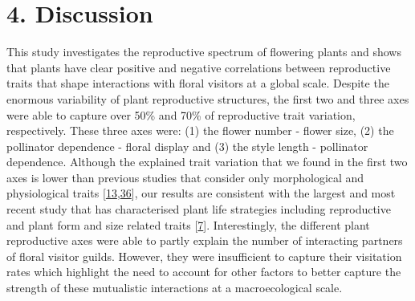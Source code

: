 \documentclass[
  12pt,
  a4paper,
]{article}
\begin{document}
\hypertarget{discussion}{%
\section{4. Discussion}\label{discussion}}

This study investigates the reproductive spectrum of flowering plants and shows that plants have clear positive and negative correlations between reproductive traits that shape interactions with floral visitors at a global scale. Despite the enormous variability of plant reproductive structures, the first two and three axes were able to capture over 50\% and 70\% of reproductive trait variation, respectively. These three axes were: (1) the flower number - flower size, (2) the pollinator dependence - floral display and (3) the style length - pollinator dependence. Although the explained trait variation that we found in the first two axes is lower than previous studies that consider only morphological and physiological traits {[}\protect\hyperlink{ref-diaz2016}{13},\protect\hyperlink{ref-carmona2021}{36}{]}, our results are consistent with the largest and most recent study that has characterised plant life strategies including reproductive and plant form and size related traits {[}\protect\hyperlink{ref-salguero2016}{7}{]}. Interestingly, the different plant reproductive axes were able to partly explain the number of interacting partners of floral visitor guilds. However, they were insufficient to capture their visitation rates which highlight the need to account for other factors to better capture the strength of these mutualistic interactions at a macroecological scale.
\end{document}
